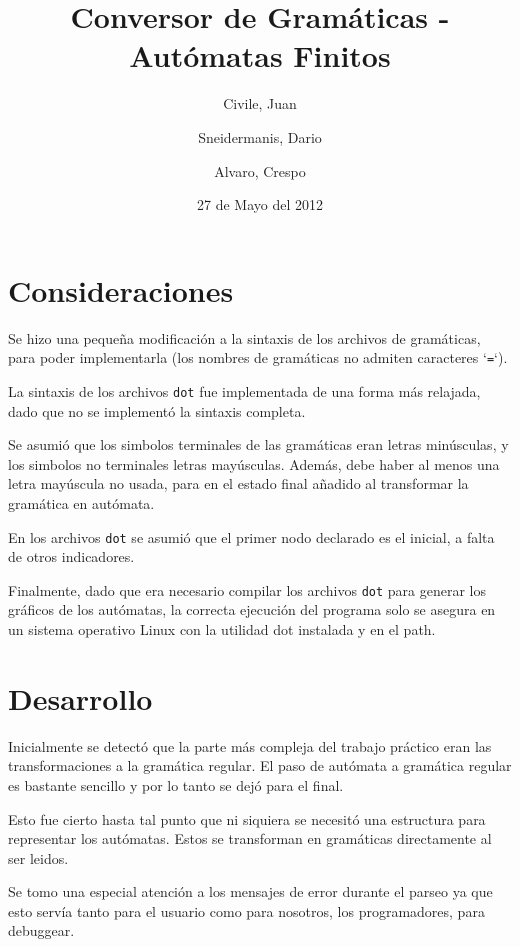 \documentclass[11pt,a4paper,titlepage]{article}
\title{Conversor de Gramáticas - Autómatas Finitos}
\author{Civile, Juan \and Sneidermanis, Dario \and Alvaro, Crespo}
\date{27 de Mayo del 2012}
\begin{document}
\newcommand{\awesome}[1]{\texttt{\large #1}}

\maketitle
\tableofcontents
\clearpage

\section{Consideraciones}

    Se hizo una pequeña modificación a la sintaxis de los archivos de
    gramáticas, para poder implementarla (los nombres de gramáticas no
    admiten caracteres `\texttt{=}`).

    La sintaxis de los archivos \texttt{dot} fue implementada de una forma más
    relajada, dado que no se implementó la sintaxis completa.

    Se asumió que los simbolos terminales de las gramáticas eran letras
    minúsculas, y los simbolos no terminales letras mayúsculas. Además, debe
    haber al menos una letra mayúscula no usada, para en el estado
    final añadido al transformar la gramática en autómata.

    En los archivos \texttt{dot} se asumió que el primer nodo declarado es el
    inicial, a falta de otros indicadores.

    Finalmente, dado que era necesario compilar los archivos \texttt{dot} para
    generar los gráficos de los autómatas, la correcta ejecución del programa
    solo se asegura en un sistema operativo Linux con la utilidad dot instalada
    y en el path.

\section{Desarrollo}

    Inicialmente se detectó que la parte más compleja del trabajo práctico
    eran las transformaciones a la gramática regular. El paso de autómata
    a gramática regular es bastante sencillo y por lo tanto se dejó para el
    final.

    Esto fue cierto hasta tal punto que ni siquiera se necesitó una estructura
    para representar los autómatas. Estos se transforman en gramáticas
    directamente al ser leidos.

    Se tomo una especial atención a los mensajes de error durante el parseo ya
    que esto servía tanto para el usuario como para nosotros, los
    programadores, para debuggear.
\end{document}
